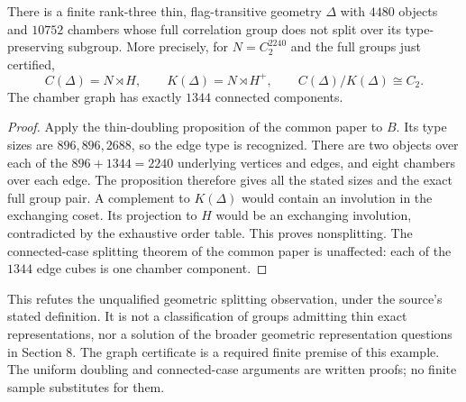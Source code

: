 \begin{theorem}
\label{A126.ThinCounterexample}
There is a finite rank-three thin, flag-transitive geometry $\Delta$
with $4480$ objects and $10752$ chambers whose full correlation group
does not split over its type-preserving subgroup. More precisely, for
$N=C_2^{2240}$ and the full groups just certified,
\[
 C(\Delta)=N\rtimes H,\qquad K(\Delta)=N\rtimes H^+,
 \qquad C(\Delta)/K(\Delta)\cong C_2.
\]
The chamber graph has exactly $1344$ connected components.
\end{theorem}
\begin{proof}
Apply the thin-doubling proposition of the common paper to $B$.
Its type sizes are $896,896,2688$, so the edge type is recognized.
There are two objects over each of the $896+1344=2240$ underlying
vertices and edges, and eight chambers over each edge. The proposition
therefore gives all the stated sizes and the exact full group pair.
A complement to $K(\Delta)$ would contain an involution in the
exchanging coset. Its projection to $H$ would be an exchanging
involution, contradicted by the exhaustive order table. This proves
nonsplitting. The connected-case splitting theorem of the common paper
is unaffected: each of the $1344$ edge cubes is one chamber component.
\end{proof}

This refutes the unqualified geometric splitting observation, under the
source's stated definition. It is not a classification of groups admitting
thin exact representations, nor a solution of the broader geometric
representation questions in Section 8. The graph certificate is a required
finite premise of this example. The uniform doubling and connected-case
arguments are written proofs; no finite sample substitutes for them.
